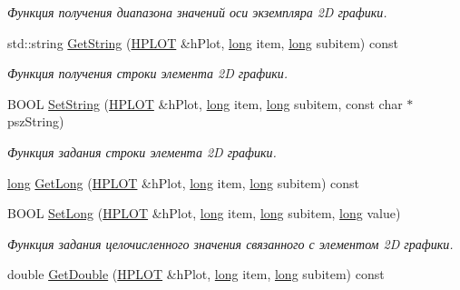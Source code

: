 \begin{DoxyCompactItemize}
\begin{DoxyCompactList}\small\item\em Функция получения диапазона значений оси экземпляра 2\-D графики. \end{DoxyCompactList}\item 
std\-::string \hyperlink{group__gr_elements_ga854706a96f0c8cfba9db24dc3f4bb54f}{Get\-String} (\hyperlink{classxyplot_1_1_h_p_l_o_t}{H\-P\-L\-O\-T} \&h\-Plot, \hyperlink{namespacexyplot_a27bc71b0bdfac09495e7e531d8a918c5}{long} item, \hyperlink{namespacexyplot_a27bc71b0bdfac09495e7e531d8a918c5}{long} subitem) const 
\begin{DoxyCompactList}\small\item\em Функция получения строки элемента 2\-D графики. \end{DoxyCompactList}\item 
B\-O\-O\-L \hyperlink{group__gr_elements_ga765727fbc082d07df181ba5bacb230f3}{Set\-String} (\hyperlink{classxyplot_1_1_h_p_l_o_t}{H\-P\-L\-O\-T} \&h\-Plot, \hyperlink{namespacexyplot_a27bc71b0bdfac09495e7e531d8a918c5}{long} item, \hyperlink{namespacexyplot_a27bc71b0bdfac09495e7e531d8a918c5}{long} subitem, const char $\ast$psz\-String)
\begin{DoxyCompactList}\small\item\em Функция задания строки элемента 2\-D графики. \end{DoxyCompactList}\item 
\hyperlink{namespacexyplot_a27bc71b0bdfac09495e7e531d8a918c5}{long} \hyperlink{group__gr_elements_ga02ac169b6968c5e778fdb120cfa2cbb5}{Get\-Long} (\hyperlink{classxyplot_1_1_h_p_l_o_t}{H\-P\-L\-O\-T} \&h\-Plot, \hyperlink{namespacexyplot_a27bc71b0bdfac09495e7e531d8a918c5}{long} item, \hyperlink{namespacexyplot_a27bc71b0bdfac09495e7e531d8a918c5}{long} subitem) const 
\item 
B\-O\-O\-L \hyperlink{group__gr_elements_gaa92b59ee49654f44a139658e0e2e4af4}{Set\-Long} (\hyperlink{classxyplot_1_1_h_p_l_o_t}{H\-P\-L\-O\-T} \&h\-Plot, \hyperlink{namespacexyplot_a27bc71b0bdfac09495e7e531d8a918c5}{long} item, \hyperlink{namespacexyplot_a27bc71b0bdfac09495e7e531d8a918c5}{long} subitem, \hyperlink{namespacexyplot_a27bc71b0bdfac09495e7e531d8a918c5}{long} value)
\begin{DoxyCompactList}\small\item\em Функция задания целочисленного значения связанного с элементом 2\-D графики. \end{DoxyCompactList}\item 
double \hyperlink{group__gr_elements_gabc94c084a9d1e27c112606bac9ed6505}{Get\-Double} (\hyperlink{classxyplot_1_1_h_p_l_o_t}{H\-P\-L\-O\-T} \&h\-Plot, \hyperlink{namespacexyplot_a27bc71b0bdfac09495e7e531d8a918c5}{long} item, \hyperlink{namespacexyplot_a27bc71b0bdfac09495e7e531d8a918c5}{long} subitem) const 

\end{DoxyCompactItemize}
